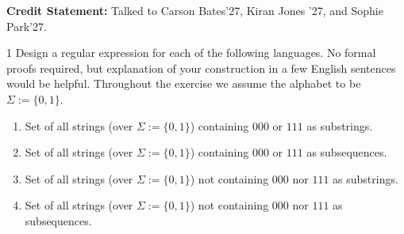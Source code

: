\documentclass[12pt]{article}
\begin{document}


\vspace{.1in}

\textbf{Credit Statement:} Talked to Carson Bates'27, Kiran Jones '27, and Sophie Park'27. 

\begin{problem}{1}
    Design a regular expression for each of the following languages. No formal proofs required, but explanation of your construction in a few English sentences would be helpful. Throughout the exercise we assume the alphabet to be $\Sigma := \{0, 1\}.$

    \begin{enumerate}
        \item Set of all strings (over $\Sigma := \{0,1\}$) containing $000$ or $111$ as substrings.
        \item Set of all strings (over $\Sigma := \{0,1\}$) containing $000$ or $111$ as subsequences.
        \item Set of all strings (over $\Sigma := \{0,1\}$) not containing $000$ nor $111$ as substrings.
        \item Set of all strings (over $\Sigma := \{0,1\}$) not containing $000$ nor $111$ as subsequences.
    \end{enumerate}
\end{problem}
\end{document}

